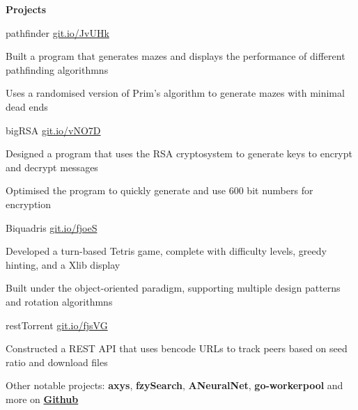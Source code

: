\documentclass{resume} %
\DeclareRobustCommand{\&}{%
  \ifdim\fontdimen1\font>0pt
    \textsl{\symbol{`\&}}%
  \else
    \symbol{`\&}%
  \fi
}
\begin{document}

\begin{rSection}{\textbf{Projects}}

\begin{rProjectSection}{pathfinder}
		{{\href{https://github.com/MSJawad/pathfinder}
				{git.io/JvUHk}}}
		
		\item Built a program that generates mazes and displays the performance of different pathfinding algorithmns
		\item	Uses a randomised version of Prim's algorithm to generate mazes with minimal dead ends
	\end{rProjectSection}

  \begin{rProjectSection}{bigRSA}
	  {{\href{https://github.com/MSJawad/bigRSA}
		    {git.io/vNO7D}}}

    \item Designed a program that uses the RSA cryptosystem to generate keys to encrypt and decrypt messages
    \item Optimised the program to quickly generate and use 600 bit numbers for encryption
    
    \end{rProjectSection}
    
   \begin{rProjectSection}{Biquadris}
	  {{\href{https://github.com/MiltonIp/Biquadris}
		    {git.io/fjoeS}}}
    \item Developed a turn-based Tetris game, complete with difficulty levels, greedy hinting, and a Xlib display
    \item Built under the object{-}oriented paradigm, supporting multiple design patterns and rotation algorithmns
 
  \end{rProjectSection}
	
	  \begin{rProjectSection}{restTorrent}
		{{\href{https://github.com/MSJawad/restTorrent}
				{git.io/fjsVG}}}
		\item  Constructed a REST API that uses bencode URLs to track peers based on seed ratio and download files
				
	\end{rProjectSection}	
	
\begin{rMinisection}
      \item {Other notable projects:} {\textbf{axys}},{ \textbf{fzySearch}},
     {\textbf{ANeuralNet}}, {\textbf{go-workerpool}} and more on
      \href{https://github.com/MSJawad}{\textbf{Github}}
 \end{rMinisection}
\end{rSection}
\end{document}

